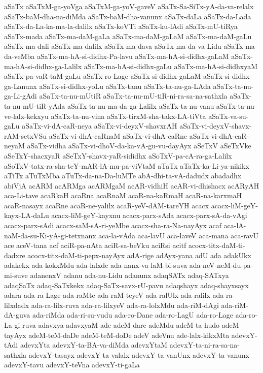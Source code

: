 {aSaTx
aSaTxM-ga-yoVga
aSaTxM-ga-yoV-gaveV
aSaTx-Sa-SiTx-yA-da-va-relalx
aSaTx-baM-dha-na-diMda
aSaTx-baM-dha-vanunx
aSaTx-daLa
aSaTx-da-Lada
aSaTx-da-La-ka-ma-la-dalilx
aSaTx-koVTi
aSaTx-ku-lAdi
aSaTx-mU-tiRya
aSaTx-mada
aSaTx-ma-daM-gaLa
aSaTx-ma-daM-gaLaM
aSaTx-ma-daM-gaLu
aSaTx-ma-dali
aSaTx-ma-dalilx
aSaTx-ma-dava
aSaTx-ma-da-va-Lidu
aSaTx-ma-da-veMba
aSaTx-ma-hA-si-didhx-Pa-lavu
aSaTx-ma-hA-si-didhx-gaLaM
aSaTx-ma-hA-si-didhx-ga-Lalilx
aSaTx-ma-hA-si-didhx-gaLu
aSaTx-ma-hA-si-didhxyaM
aSaTx-pa-vaR-taM-gaLu
aSaTx-ro-Lage
aSaTx-si-didhx-gaLaM
aSaTx-si-didhx-ga-Lanunx
aSaTx-si-didhx-yoLu
aSaTx-tanu
aSaTx-ta-nu-ga-LAda
aSaTx-ta-nu-ga-Li-gAdi
aSaTx-ta-nu-mUtiR
aSaTx-ta-nu-mU-tiR-ni-ra-sa-na-sathxla
aSaTx-ta-nu-mU-tiR-yAda
aSaTx-ta-nu-ma-da-ga-Lalilx
aSaTx-ta-nu-vanu
aSaTx-ta-nu-ve-lalx-kekxyu
aSaTx-ta-nu-vina
aSaTx-tirxM-sha-takx-LA-tiVta
aSaTx-va-su-gaLu
aSaTx-vi-dA-caR-neya
aSaTx-vi-deyxV-shavxrAH
aSaTx-vi-deyxV-shavx-rAM-setxVSu
aSaTx-vi-dhA-caRnaM
aSaTx-vi-dhA-caRne
aSaTx-vi-dhA-caR-neyaM
aSaTx-vidha
aSaTx-vi-dhoV-da-ka-vA-gu-vu-dayAyx
aSeTxV
aSeTxVke
aSeTxY-shacxyaR
aSeTxY-shavx-yaR-sididhx
aSoTxV-pa-cA-ra-ga-Lalilx
aSoTxV-tatx-ra-sha-teY-mAR-lA-mu-pa-viVtaM
aTaTx
aTaTx-ka-Li-ya-nikikx
aTiTx
aTuTxMba
aTuTx-da-na-Da-luMTe
abA-dhi-ta-vA-dadudx
abadadhx
abiVjA
acARM
acARMga
acARMgaM
acAR-vidhiH
acAR-vi-dhishacx
acARyAH
aca-Li-tave
acaRkaH
acaRna
acaRnaM
acaR-na-kaRmaH
acaR-na-karxmaH
acaR-nasayx
acaRne
acaR-ne-yalilx
acaR-yeV-dAM-tareYH
acacx
acacx-liM-geY-kayx-LA-daLu
acacx-liM-geY-kayxnu
acacx-parx-sAda
acacx-parx-sA-da-vAgi
acacx-parx-sAdi
acacx-saM-sA-ri-yeMbe
acacx-sha-ra-Na-nayAyx
acaf
aca-lA-naM-da-su-Ki-yA-gi-tetxnanx
aca-la-vAda
aca-lavU
aca-laveV
aca-mana
aca-ravU
ace
aceV-tana
acf
aciR-pa-nAta
aciR-sa-beVku
aciRsi
acitf
acocx-titx-daM-ti-dadxre
acocx-titx-daM-ti-pepx-nayAyx
adA-rige
adAyx-yana
adU
ada
adakUkx
adakekx
ada-kokxMdu
ada-lalxde
ada-nanx-va-laM-bi-suva
ada-neV-neM-du-pa-mi-suve
adanenxV
adanu
ada-nu-Lidu
adanunx
adaqSATx
adaq-SATxya
adaqSaTx
adaq-SaTxkekx
adaq-SaTx-savx-rU-pavu
adaqshayx
adaq-shayxsayx
adara
ada-ra-Lage
ada-raMte
ada-raM-teyeV
ada-ralUlx
ada-ralilx
ada-ra-lilxdadx
ada-ra-lilx-ruva
ada-ra-lilxyeV
ada-ra-lolxMdu
ada-riM-dAgi
ada-riM-dA-guva
ada-riMda
ada-ri-su-vudu
ada-ro-Dane
ada-ro-LagU
ada-ro-Lage
ada-ro-La-gi-ruva
adavxya
adavxyaM
ade
adeM-dare
adeMdu
adeM-ta-hudo
adeM-tayAyx
adeM-teM-daDe
adeM-teM-doDe
adeV
adeVnu
ade-lalx-kikxMta
adevxY-tAdi
adevxYta
adevxY-ta-BA-va-diMda
adevxYtaM
adevxY-ta-ni-ra-sa-na-sathxla
adevxY-tasayx
adevxY-ta-valalx
adevxY-ta-vanUnx
adevxY-ta-vanunx
adevxY-tavu
adevxY-teVna
adevxY-ti-gaLa
}
